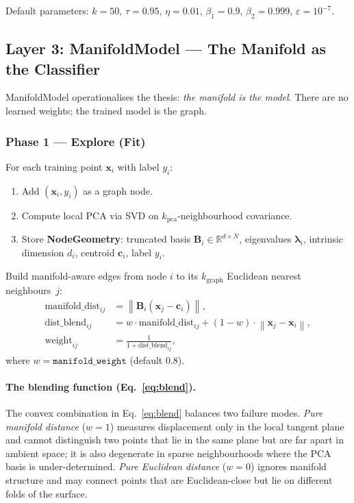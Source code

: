 \documentclass[12pt,letterpaper]{article}
\newcommand{\RR}{\mathbb{R}}
\newcommand{\bB}{\mathbf{B}}
\newcommand{\bx}{\mathbf{x}}
\newcommand{\bc}{\mathbf{c}}
\newcommand{\norm}[1]{\left\lVert#1\right\rVert}
\begin{document}
Default parameters: $k{=}50$, $\tau{=}0.95$, $\eta{=}0.01$,
$\beta_1{=}0.9$, $\beta_2{=}0.999$, $\varepsilon{=}10^{-7}$.

\subsection{Layer 3: ManifoldModel --- The Manifold as the Classifier}

ManifoldModel operationalises the thesis: \emph{the manifold is the model}.
There are no learned weights; the trained model is the graph.

\subsubsection{Phase 1 --- Explore (Fit)}

For each training point $\bx_i$ with label $y_i$:
\begin{enumerate}[leftmargin=*]
  \item Add $(\bx_i, y_i)$ as a graph node.
  \item Compute local PCA via SVD on $k_\text{pca}$-neighbourhood covariance.
  \item Store \textbf{NodeGeometry}: truncated basis $\bB_i \in \RR^{d\times N}$,
    eigenvalues $\bm\lambda_i$, intrinsic dimension $d_i$, centroid
    $\bc_i$, label $y_i$.
\end{enumerate}

Build manifold-aware edges from node $i$ to its $k_\text{graph}$ Euclidean
nearest neighbours~$j$:
\begin{align}
  \text{manifold\_dist}_{ij} &= \norm{\bB_i(\bx_j - \bc_i)}, \label{eq:mdist}\\
  \text{dist\_blend}_{ij}    &= w\cdot\text{manifold\_dist}_{ij}
                                + (1-w)\cdot\norm{\bx_j-\bx_i}, \label{eq:blend}\\
  \text{weight}_{ij}         &= \frac{1}{1 + \text{dist\_blend}_{ij}},
  \label{eq:eweight}
\end{align}
where $w = \texttt{manifold\_weight}$ (default $0.8$).

\paragraph{The blending function (Eq.~\ref{eq:blend}).}
The convex combination in Eq.~\eqref{eq:blend} balances two failure modes.
\emph{Pure manifold distance} ($w{=}1$) measures displacement only in the local
tangent plane and cannot distinguish two points that lie in the same plane but
are far apart in ambient space; it is also degenerate in sparse neighbourhoods
where the PCA basis is under-determined.  \emph{Pure Euclidean distance}
($w{=}0$) ignores manifold structure and may connect points that are
Euclidean-close but lie on different folds of the surface.
\end{document}
